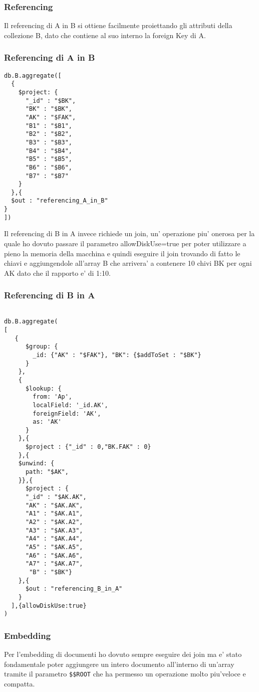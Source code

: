 \subsubsection{Referencing}

Il referencing di A in B si ottiene facilmente proiettando gli attributi della collezione B, dato che contiene al suo interno la foreign Key di A.

\subsubsection{Referencing di A in B}

\begin{verbatim}
db.B.aggregate([
  {
    $project: {
      "_id" : "$BK",
      "BK" : "$BK",
      "AK" : "$FAK",
      "B1" : "$B1",   
      "B2" : "$B2",
      "B3" : "$B3",
      "B4" : "$B4",
      "B5" : "$B5",
      "B6" : "$B6",
      "B7" : "$B7"
    }
  },{
  $out : "referencing_A_in_B"
}
])
\end{verbatim}

Il referencing di B in A invece richiede un join, un' operazione piu' onerosa per la quale ho dovuto passare il parametro allowDiskUse=true per poter utilizzare
a pieno la memoria della macchina e quindi eseguire il join trovando di fatto le chiavi e aggiungendole all'array B che arrivera' a contenere 10 chivi BK per ogni 
AK dato che il rapporto e' di 1:10. 

\subsubsection{Referencing di B in A}

\begin{verbatim}
    
db.B.aggregate(
[
   {
      $group: {
        _id: {"AK" : "$FAK"}, "BK": {$addToSet : "$BK"}
      }
    },
    {
      $lookup: {
        from: 'Ap',
        localField: '_id.AK',
        foreignField: 'AK',
        as: 'AK'
      }
    },{
      $project : {"_id" : 0,"BK.FAK" : 0}
    },{
    $unwind: {
      path: "$AK",
    }},{
      $project : {
      "_id" : "$AK.AK",
      "AK" : "$AK.AK",
      "A1" : "$AK.A1", 
      "A2" : "$AK.A2", 
      "A3" : "$AK.A3", 
      "A4" : "$AK.A4",
      "A5" : "$AK.A5",
      "A6" : "$AK.A6",
      "A7" : "$AK.A7",
       "B" : "$BK"} 
    },{
      $out : "referencing_B_in_A"
    }
  ],{allowDiskUse:true}
)
\end{verbatim}

\subsubsection{Embedding}
Per l'embedding di documenti ho dovuto sempre eseguire dei join ma e' stato fondamentale poter aggiungere un intero documento all'interno di un'array tramite il parametro
\verb|$$ROOT| che ha permesso un operazione molto piu'veloce e compatta.

